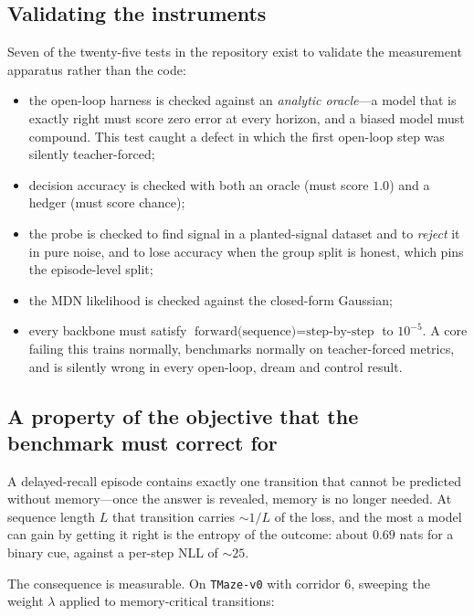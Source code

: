 \documentclass[11pt,a4paper]{article}
\newcommand{\code}[1]{\texttt{\small #1}}
\begin{document}
\subsection{Validating the instruments}

Seven of the twenty-five tests in the repository exist to validate the
measurement apparatus rather than the code:

\begin{itemize}[leftmargin=*]
\item the open-loop harness is checked against an \emph{analytic oracle}---a
model that is exactly right must score zero error at every horizon, and a biased
model must compound. This test caught a defect in which the first open-loop step
was silently teacher-forced;
\item decision accuracy is checked with both an oracle (must score $1.0$) and a
hedger (must score chance);
\item the probe is checked to find signal in a planted-signal dataset and to
\emph{reject} it in pure noise, and to lose accuracy when the group split is
honest, which pins the episode-level split;
\item the MDN likelihood is checked against the closed-form Gaussian;
\item every backbone must satisfy $\text{forward(sequence)} =
\text{step-by-step}$ to $10^{-5}$. A core failing this trains normally,
benchmarks normally on teacher-forced metrics, and is silently wrong in every
open-loop, dream and control result.
\end{itemize}

\subsection{A property of the objective that the benchmark must correct for}
\label{sec:findings-nll}

A delayed-recall episode contains exactly one transition that cannot be predicted
without memory---once the answer is revealed, memory is no longer needed. At
sequence length $L$ that transition carries ${\sim}1/L$ of the loss, and the most
a model can gain by getting it right is the entropy of the outcome: about $0.69$
nats for a binary cue, against a per-step NLL of ${\sim}25$.

The consequence is measurable. On \code{TMaze-v0} with corridor 6, sweeping the
weight $\lambda$ applied to memory-critical transitions:
\end{document}
